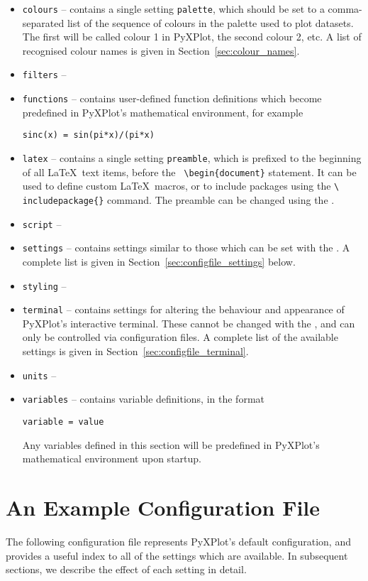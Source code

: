 \begin{itemize}
\item {\tt colours} -- contains a single setting {\tt palette}, which should be
set to a comma-separated list of the sequence of colours in the palette used to
plot datasets. The first will be called colour 1 in PyXPlot, the second colour
2, etc. A list of recognised colour names is given in
Section~\ref{sec:colour_names}.
\item {\tt filters} --
\item {\tt functions} -- contains user-defined function definitions which
become predefined in PyXPlot's mathematical environment, for example
\begin{verbatim}
sinc(x) = sin(pi*x)/(pi*x)
\end{verbatim}
\item {\tt latex} -- contains a single setting {\tt preamble}, which is
prefixed to the beginning of all \LaTeX\ text items, before the {\tt
\textbackslash begin\{document\}} statement. It can be used to define custom
\LaTeX\ macros, or to include packages using the {\tt \textbackslash
includepackage\{\}} command.  The preamble can be changed using the
.
\item {\tt script} -- 
\item {\tt settings} -- contains settings similar to those which can be set
with the . A complete list is given in
Section~\ref{sec:configfile_settings} below.
\item {\tt styling} --
\item {\tt terminal} -- contains settings for altering the behaviour and
appearance of PyXPlot's interactive terminal. These cannot be changed with the
, and can only be controlled via configuration files. A complete
list of the available settings is given in
Section~\ref{sec:configfile_terminal}.
\item {\tt units} --
\item {\tt variables} -- contains variable definitions, in the format
\begin{verbatim}
variable = value
\end{verbatim}
Any variables defined in this section will be predefined in PyXPlot's
mathematical environment upon startup.

\end{itemize}

\section{An Example Configuration File}
\noindent The following configuration file represents PyXPlot's default
configuration, and provides a useful index to all of the settings which are
available. In subsequent sections, we describe the effect of each setting in
detail.

